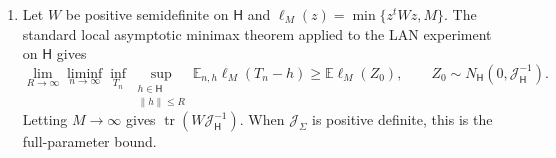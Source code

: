 \begin{theorem}
\begin{enumerate}
\item Let $W$ be positive semidefinite on $\mathsf H$ and
$\ell_M(z)=\min\{z^tWz,M\}$.  The standard local asymptotic minimax theorem
applied to the LAN experiment on $\mathsf H$ gives
\begin{equation}\label{eq:v22-minimax-truncated}
 \lim_{R\to\infty}\liminf_{n\to\infty}
 \inf_{T_n}\sup_{\substack{h\in\mathsf H\\\|h\|\le R}}
 \mathbb E_{n,h}\ell_M(T_n-h)
 \ge
 \mathbb E\ell_M(Z_0),
 \qquad
 Z_0\sim N_{\mathsf H}(0,\mathcal J_{\mathsf H}^{-1}).
\end{equation}
Letting $M\to\infty$ gives
$\operatorname{tr}(W\mathcal J_{\mathsf H}^{-1})$.  When
$\mathcal J_\Sigma$ is positive definite, this is the full-parameter bound.
\end{enumerate}
\end{theorem}

